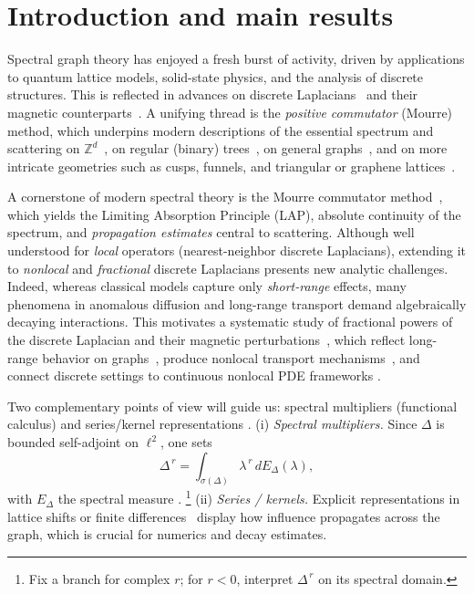 \documentclass[10pt]{amsart}
\newcommand{\1}{{\mathbb{I}}}
\numberwithin{equation}{section}
\begin{document}
\section{Introduction and main results}\label{sec:intro}
Spectral graph theory has enjoyed a fresh burst of activity, driven by applications to quantum lattice models, solid-state physics, and the analysis of discrete structures. This is reflected in advances on discrete Laplacians~\cite{AD,AEG,BG,S,GG,Ch,Mic,Gk} and their magnetic counterparts~\cite{GT,Da1,GoMo,AEG1,ABDE}.  A unifying thread is the \emph{positive commutator} (Mourre) method, which underpins modern descriptions of the essential spectrum and scattering on $\mathbb{Z}^d$~\cite{PR,BoSa,T1}, on regular (binary) trees~\cite{S,AF,GG}, on general graphs~\cite{MRT}, and on more intricate geometries such as cusps, funnels, and triangular or graphene lattices~\cite{T2,GoMo,AEG,AEG1,AEGJ,AEGJ2}.

A cornerstone of modern spectral theory is the Mourre commutator method~\cite{GJ,GJ1,Mo81,Ge,ABG,Da}, which yields the Limiting Absorption Principle (LAP), absolute continuity of the spectrum, and \emph{propagation estimates} central to scattering. Although well understood for \emph{local} operators (nearest-neighbor discrete Laplacians), extending it to \emph{nonlocal} and \emph{fractional} discrete Laplacians presents new analytic challenges. Indeed, whereas classical models capture only \emph{short-range} effects, many phenomena in anomalous diffusion and long-range transport demand algebraically decaying interactions. This motivates a systematic study of fractional powers of the discrete Laplacian and their magnetic perturbations~\cite{JKLQ,BDL,K2017,GH}, which reflect long-range behavior on graphs~\cite{PKLBMH,Fan2021,TZ}, produce nonlocal transport mechanisms~\cite{ScSo2012}, and connect discrete settings to continuous nonlocal PDE frameworks \cite{JKLQ,BDL,K2017,Or,Ortigueira2014Riesz}.


Two complementary points of view will guide us: spectral multipliers (functional calculus) and series/kernel representations .
(i) \emph{Spectral multipliers.} Since $\Delta$ is bounded self-adjoint on $\ell^2$, one sets
\[
\Delta^{\,r}=\int_{\sigma(\Delta)}\lambda^{\,r}\,dE_\Delta(\lambda),
\]
with $E_\Delta$ the spectral measure \cite{RS,SI2015,Dav}.%
\footnote{Fix a branch for complex $r$; for $r<0$, interpret $\Delta^{\,r}$ on its spectral domain.}
(ii) \emph{Series / kernels.} Explicit representations in lattice shifts or finite differences~\cite{K2017} display how influence propagates across the graph, which is crucial for numerics and decay estimates.
\end{document}
